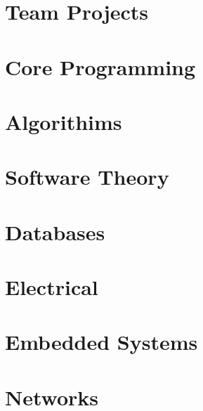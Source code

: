 \section{Team Projects}
\hypertarget{cat:team}{}
\newpage










\section{Core Programming}
\hypertarget{cat:programming}{}




\section{Algorithims}
\hypertarget{cat:algo}{}



\section{Software Theory}
\hypertarget{cat:theory}{}



\section{Databases}
\hypertarget{cat:database}{}





\section{Electrical}
\hypertarget{cat:elec}{}


\section{Embedded Systems}
\hypertarget{cat:embedded}{}





\section{Networks}
\hypertarget{cat:network}{}



